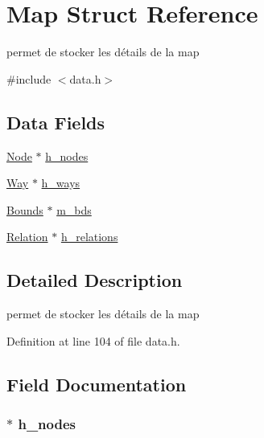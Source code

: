 \hypertarget{struct_map}{}\section{Map Struct Reference}
\label{struct_map}


permet de stocker les détails de la map  




{\ttfamily \#include $<$data.\+h$>$}

\subsection*{Data Fields}
\begin{DoxyCompactItemize}
\item 
\hyperlink{struct_node}{Node} $\ast$ \hyperlink{struct_map_a558e97314f5dee487c68abcd21658877}{h\+\_\+nodes}
\item 
\hyperlink{struct_way}{Way} $\ast$ \hyperlink{struct_map_a255d568bce680d722841b9343f6cc90a}{h\+\_\+ways}
\item 
\hyperlink{struct_bounds}{Bounds} $\ast$ \hyperlink{struct_map_afe75a6a865f0b33f04695c4134b4b37d}{m\+\_\+bds}
\item 
\hyperlink{struct_relation}{Relation} $\ast$ \hyperlink{struct_map_abc1f65a8dd87d50c657bea6a0b157f56}{h\+\_\+relations}
\end{DoxyCompactItemize}


\subsection{Detailed Description}
permet de stocker les détails de la map 

Definition at line 104 of file data.\+h.



\subsection{Field Documentation}
\subsubsection[{\texorpdfstring{h\+\_\+nodes}{h_nodes}}]{$\ast$ h\+\_\+nodes}\hypertarget{struct_map_a558e97314f5dee487c68abcd21658877}{}\label{struct_map_a558e97314f5dee487c68abcd21658877}


